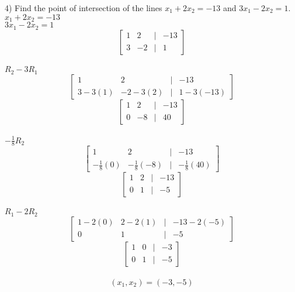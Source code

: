 \documentclass[]{article}
\begin{document}
4) Find the point of intersection of the lines $x_1+2x_2=-13$ and $3x_1-2x_2=1$.\\
$x_1+2x_2=-13$\\
$3x_1-2x_2 = 1$\\
\[
\begin{bmatrix}
	1&2&|&-13\\
	3&-2&|&1
\end{bmatrix}
\]\\
$R_2-3R_1$
\[
\begin{bmatrix}
	1&2&|&-13\\
	3-3(1)&-2-3(2)&|&1-3(-13)
\end{bmatrix}
\]
\[
\begin{bmatrix}
	1&2&|&-13\\
	0&-8&|&40
\end{bmatrix}
\]\\
$-\frac{1}{8}R_2$
\[
\begin{bmatrix}
	1&2&|&-13\\
	-\frac{1}{8}(0)&-\frac{1}{8}(-8)&|&-\frac{1}{8}(40)
\end{bmatrix}
\]
\[
\begin{bmatrix}
	1&2&|&-13\\
	0&1&|&-5
\end{bmatrix}
\]\\
$R_1-2R_2$
\[
\begin{bmatrix}
	1-2(0)&2-2(1)&|&-13-2(-5)\\
	0&1&|&-5
\end{bmatrix}
\]
\[
\begin{bmatrix}
	1&0&|&-3\\
	0&1&|&-5
\end{bmatrix}
\]\\
$$(x_1, x_2) = (-3, -5)$$\\
\end{document}
